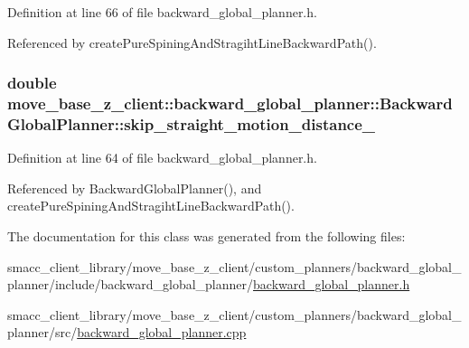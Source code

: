 Definition at line 66 of file backward\+\_\+global\+\_\+planner.\+h.



Referenced by create\+Pure\+Spining\+And\+Stragiht\+Line\+Backward\+Path().

\subsubsection[{\texorpdfstring{skip\+\_\+straight\+\_\+motion\+\_\+distance\+\_\+}{skip_straight_motion_distance_}}]{\setlength{\rightskip}{0pt plus 5cm}double move\+\_\+base\+\_\+z\+\_\+client\+::backward\+\_\+global\+\_\+planner\+::\+Backward\+Global\+Planner\+::skip\+\_\+straight\+\_\+motion\+\_\+distance\+\_\+\hspace{0.3cm}{\ttfamily [private]}}\hypertarget{classmove__base__z__client_1_1backward__global__planner_1_1BackwardGlobalPlanner_a422769ec3244dfe8ef5bd81e397092c0}{}\label{classmove__base__z__client_1_1backward__global__planner_1_1BackwardGlobalPlanner_a422769ec3244dfe8ef5bd81e397092c0}


Definition at line 64 of file backward\+\_\+global\+\_\+planner.\+h.



Referenced by Backward\+Global\+Planner(), and create\+Pure\+Spining\+And\+Stragiht\+Line\+Backward\+Path().



The documentation for this class was generated from the following files\+:\begin{DoxyCompactItemize}
\item 
smacc\+\_\+client\+\_\+library/move\+\_\+base\+\_\+z\+\_\+client/custom\+\_\+planners/backward\+\_\+global\+\_\+planner/include/backward\+\_\+global\+\_\+planner/\hyperlink{backward__global__planner_8h}{backward\+\_\+global\+\_\+planner.\+h}\item 
smacc\+\_\+client\+\_\+library/move\+\_\+base\+\_\+z\+\_\+client/custom\+\_\+planners/backward\+\_\+global\+\_\+planner/src/\hyperlink{backward__global__planner_8cpp}{backward\+\_\+global\+\_\+planner.\+cpp}\end{DoxyCompactItemize}
